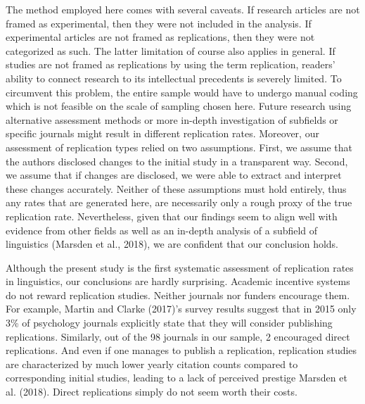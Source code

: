 \documentclass[]{elsarticle} %
\begin{document}
The method employed here comes with several caveats. If research articles are not framed as experimental, then they were not included in the analysis. If experimental articles are not framed as replications, then they were not categorized as such. The latter limitation of course also applies in general. If studies are not framed as replications by using the term replication, readers' ability to connect research to its intellectual precedents is severely limited. To circumvent this problem, the entire sample would have to undergo manual coding which is not feasible on the scale of sampling chosen here. Future research using alternative assessment methods or more in-depth investigation of subfields or specific journals might result in different replication rates.
Moreover, our assessment of replication types relied on two assumptions. First, we assume that the authors disclosed changes to the initial study in a transparent way. Second, we assume that if changes are disclosed, we were able to extract and interpret these changes accurately. Neither of these assumptions must hold entirely, thus any rates that are generated here, are necessarily only a rough proxy of the true replication rate. Nevertheless, given that our findings seem to align well with evidence from other fields as well as an in-depth analysis of a subfield of linguistics (Marsden et al., 2018), we are confident that our conclusion holds.

Although the present study is the first systematic assessment of replication rates in linguistics, our conclusions are hardly surprising. Academic incentive systems do not reward replication studies. Neither journals nor funders encourage them. For example, Martin and Clarke (2017)'s survey results suggest that in 2015 only 3\% of psychology journals explicitly state that they will consider publishing replications. Similarly, out of the 98 journals in our sample, 2 encouraged direct replications. And even if one manages to publish a replication, replication studies are characterized by much lower yearly citation counts compared to corresponding initial studies, leading to a lack of perceived prestige Marsden et al. (2018). Direct replications simply do not seem worth their costs.
\end{document}
